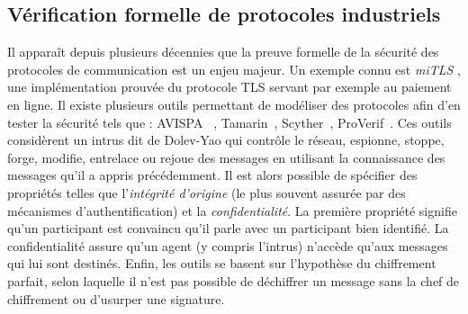 \documentclass{article}
\newcommand{\proverif}{ProVerif\xspace}
\newcommand{\avispa}{AVISPA\xspace}
\newcommand{\clatse}{CL-Atse\xspace}
\newcommand{\ofmc}{OFMC\xspace}
\newcommand{\satmc}{SAT-MC\xspace}
\newcommand{\tasp}{TA4SP\xspace}
\newcommand{\tamarin}{Tamarin\xspace}
\newcommand{\scyther}{Scyther\xspace}
\newcommand{\aramis}{ARAMIS\xspace}
\begin{document}
%        

\subsection{Vérification formelle de protocoles industriels}\label{sec:protocols}

Il apparaît depuis plusieurs décennies que la preuve formelle de
la sécurité des protocoles de communication est un enjeu majeur.
Un exemple connu est {\em miTLS} \cite{BFKPS13}, une implémentation prouvée
du protocole TLS \cite{DR08} servant par exemple au paiement en ligne.
Il existe plusieurs outils permettant de modéliser des protocoles afin d'en
tester la sécurité tels que : \avispa~\cite{AVISPA05}%
, \tamarin~\cite{MSCB13}, \scyther~\cite{Cre08}, \proverif~\cite{Bla01}.
Ces outils considèrent un intrus dit de Dolev-Yao \cite{DY81} qui contrôle le
réseau, espionne, stoppe, forge, modifie, entrelace ou rejoue des messages en
utilisant la connaissance des messages qu'il a appris précédemment.
Il est alors possible de spécifier des propriétés telles que l'{\em intégrité
d'origine} (le plus souvent assurée par des mécanismes d'authentification) et la
{\em confidentialité}.
La première propriété signifie qu'un participant est convaincu qu'il parle avec
un participant bien identifié.
La confidentialité assure qu'un agent (y compris l'intrus) n'accède qu'aux
messages qui lui sont destinés.
Enfin, les outils se basent sur l'hypothèse du chiffrement parfait, selon
laquelle il n'est pas possible de déchiffrer un message sans la chef de
chiffrement ou d'usurper une signature.
\end{document}
